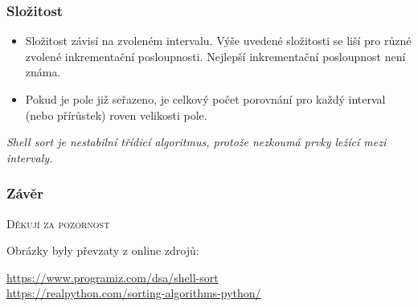 \documentclass[12pt]{beamer}
\begin{document}
\begin{frame}
    \frametitle{Složitost}
    \fontsize{10pt}{12pt}\selectfont
    \begin{itemize}
        \setlength{\itemindent}{2em}
        \item Složitost závisí na zvoleném intervalu. Výše uvedené složitosti se liší pro různé zvolené inkrementační posloupnosti. Nejlepší inkrementační posloupnost není známa.
        \item Pokud je pole již seřazeno, je celkový počet porovnání pro každý interval (nebo přírůstek) roven velikosti pole.
    \end{itemize}
    
    \hspace*{20pt}\emph{Shell sort je nestabilní třídicí algoritmus, protože nezkoumá prvky ležící mezi intervaly.}
    
\end{frame}

\begin{frame}
    \frametitle{Závěr}
    \centering
    \fontsize{16pt}{12pt}\selectfont
    \textsc{Děkují za pozornost}
    \vfill
    
    \fontsize{12pt}{12pt}\selectfont
    Obrázky byly převzaty z online zdrojů:
    \bigskip
    
    \url{https://www.programiz.com/dsa/shell-sort}\\
    \url{https://realpython.com/sorting-algorithms-python/}
\end{frame}
\end{document}
